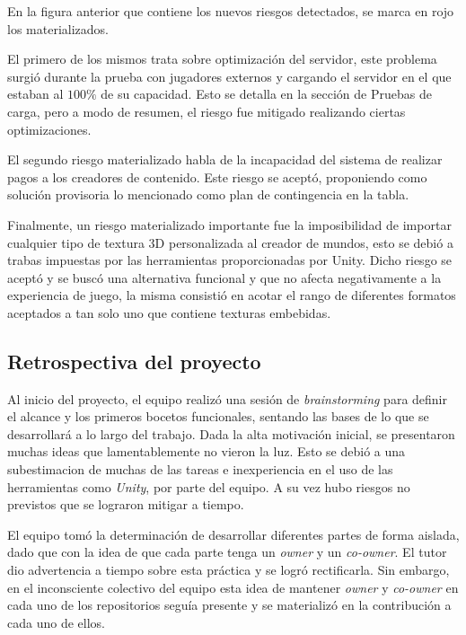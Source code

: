 \vspace{0.25cm}

En la figura anterior que contiene los nuevos riesgos detectados, se marca en rojo los materializados.

El primero de los mismos trata sobre optimización del servidor, este problema surgió durante la prueba con jugadores externos
y cargando el servidor en el que estaban al $100\%$ de su capacidad. Esto se detalla en la sección de Pruebas de carga, pero
a modo de resumen, el riesgo fue mitigado realizando ciertas optimizaciones.

El segundo riesgo materializado habla de la incapacidad del sistema de realizar pagos a los creadores de contenido. Este riesgo
se aceptó, proponiendo como solución provisoria lo mencionado como plan de contingencia en la tabla.

Finalmente, un riesgo materializado importante fue la imposibilidad de importar cualquier tipo de textura 3D personalizada
al creador de mundos, esto se debió a trabas impuestas por las herramientas proporcionadas por Unity. Dicho riesgo
se aceptó y se buscó una alternativa funcional y que no afecta negativamente a la experiencia de juego, la misma consistió
en acotar el rango de diferentes formatos aceptados a tan solo uno que contiene texturas embebidas.

\subsection{Retrospectiva del proyecto}

Al inicio del proyecto, el equipo realizó una sesión de \textit{brainstorming} para definir el alcance y los primeros bocetos 
funcionales, sentando las bases de lo que se desarrollará a lo largo del trabajo.
Dada la alta motivación inicial, se presentaron muchas ideas que lamentablemente no vieron la luz. Esto se 
debió a una subestimacion de muchas de las tareas e inexperiencia en el uso de las herramientas como \textit{Unity}, por 
parte del equipo. A su vez hubo riesgos no previstos que se lograron mitigar a tiempo.

\vspace{0.25cm}

El equipo tomó la determinación de desarrollar diferentes partes de forma aislada, dado que con la
idea de que cada parte tenga un \textit{owner} y un \textit{co-owner}. El tutor dio advertencia a tiempo sobre 
esta práctica y se logró rectificarla. Sin embargo, en el inconsciente colectivo del equipo esta idea de mantener \textit{owner} 
y \textit{co-owner} en cada uno de los repositorios seguía presente y se materializó en la contribución a cada uno de ellos.

